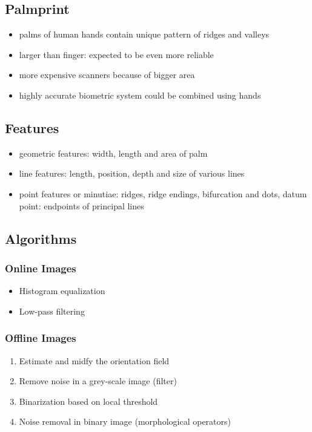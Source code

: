 \documentclass[paper=a4, fontsize=11pt]{scrartcl} %
\numberwithin{equation}{section} %
\numberwithin{figure}{section} %
\numberwithin{table}{section} %
\begin{document}
\subsection{Palmprint}

\begin{itemize}
\item palms of human hands contain unique pattern of ridges and valleys
\item larger than finger: expected to be even more reliable
\item more expensive scanners because of bigger area
\item highly accurate biometric system could be combined using hands
\end{itemize}

\subsection{Features}

\begin{itemize}
\item geometric features: width, length and area of palm
\item line features: length, position, depth and size of various lines
\item point features or minutiae: ridges, ridge endings, bifurcation and dots, datum point: endpoints of principal lines
\end{itemize}

\subsection{Algorithms}

\subsubsection{Online Images}

\begin{itemize}
\item Histogram equalization
\item Low-pass filtering
\end{itemize}

\subsubsection{Offline Images}

\begin{enumerate}
\item Estimate and midfy the orientation field
\item Remove noise in a grey-scale image (filter)
\item Binarization based on local threshold
\item Noise removal in binary image (morphological operators)
\end{enumerate}
\end{document}
